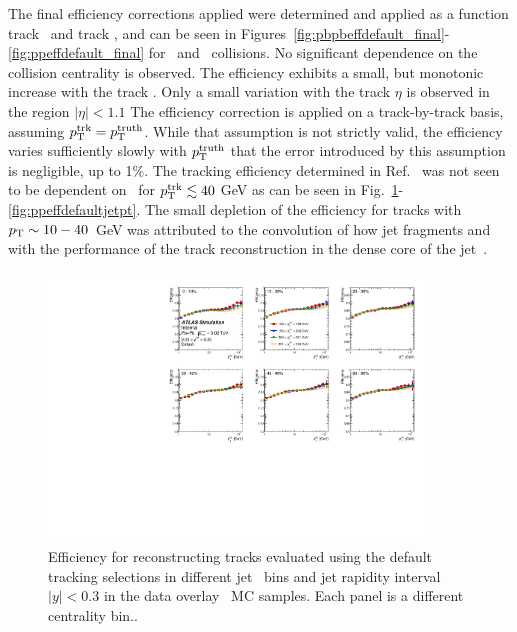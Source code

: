The final efficiency corrections applied were determined and applied as a function track \pt\ and track \eta, and can be seen in Figures~\ref{fig:pbpbeffdefault_final}-\ref{fig:ppeffdefault_final} for \pp\ and \PbPb\ collisions. No significant dependence on the collision centrality is observed. The efficiency exhibits a small, but monotonic increase with the track \pt. Only a small variation with the track $\eta$ is observed in the region $|\eta|<1.1$ The efficiency correction is applied on a track-by-track basis, assuming $\mbox{$p_{\mathrm{T}}^{\mathrm{trk}}$} = \mbox{$p_{\mathrm{T}}^{\mathrm{truth}}$}$. While that assumption is not strictly valid, the efficiency varies sufficiently slowly with $\mbox{$p_{\mathrm{T}}^{\mathrm{truth}}$}$ that the error introduced by this assumption is negligible, up to 1\%. The tracking efficiency determined in Ref.~\cite{ATLAS502FFConf} was not seen to be dependent on \ptjet\ for $\mbox{$p_{\mathrm{T}}^{\mathrm{trk}}$} \lesssim 40$ GeV as can be seen in Fig.~\ref{fig:pbpbeffdefaultjetpt_y0}-\ref{fig:ppeffdefaultjetpt}. The small depletion of the efficiency for tracks with $p_{\mathrm{T}} \sim 10-40$~GeV was attributed to the convolution of how jet fragments and with the performance of the track reconstruction in the dense core of the jet~\cite{ATLAS502FFConf}. 


\begin{figure}[ht]
   \centerline{
      \includegraphics[width=0.9\textwidth]{figures_corrections/eff_centrality_jetpt_jety0_ppTight.pdf}
   }
   \caption{Efficiency for reconstructing tracks evaluated using the default tracking selections in different jet \pT\ bins and jet rapidity interval $|y|<0.3$ in the data overlay \pbpb\ MC samples. Each panel is a different centrality bin..}
   \label{fig:pbpbeffdefaultjetpt_y0}
\end{figure}

